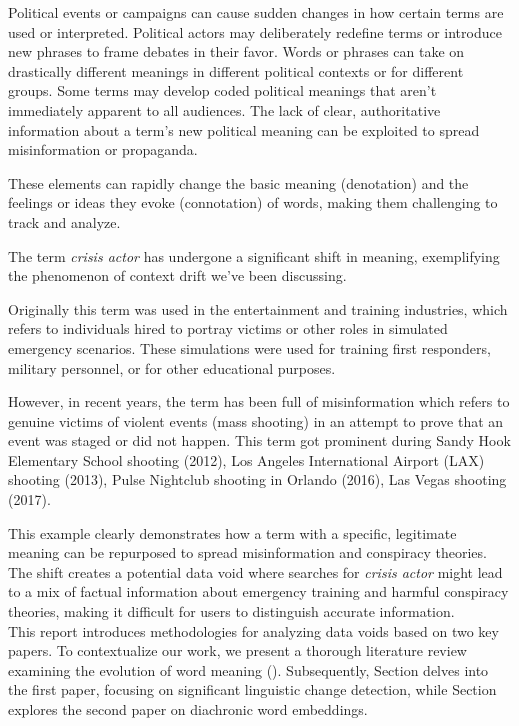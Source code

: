 Political events or campaigns can cause sudden changes in how certain terms are used or interpreted.
Political actors may deliberately redefine terms or introduce new phrases to frame debates in their favor.
Words or phrases can take on drastically different meanings in different political contexts or for different groups.
Some terms may develop coded political meanings that aren't immediately apparent to all audiences.
The lack of clear, authoritative information about a term's new political meaning can be exploited to spread misinformation or propaganda.

These elements can rapidly change the basic meaning (denotation) and the feelings or ideas they evoke (connotation) of words, making them challenging to track and analyze.

The term \emph{crisis actor} has undergone a significant shift in meaning,
exemplifying the phenomenon of context drift we've been discussing.

Originally this term was used in the entertainment and training industries,
which refers to individuals hired to portray victims or other roles in simulated emergency scenarios.
These simulations were used for training first responders, military personnel, or for other educational purposes.

However, in recent years, the term has been full of misinformation which refers to genuine victims of violent events (mass shooting) in an attempt to prove that an event was staged or did not happen.
This term got prominent during Sandy Hook Elementary School shooting (2012), Los Angeles International Airport (LAX) shooting (2013), Pulse Nightclub shooting in Orlando (2016), Las Vegas shooting (2017).

This example clearly demonstrates how a term with a specific, legitimate meaning can be repurposed to spread misinformation and conspiracy theories.
The shift creates a potential data void where searches for \emph{crisis actor} might lead to a mix of factual information about emergency training and harmful conspiracy theories,
making it difficult for users to distinguish accurate information.\\

This report introduces methodologies for analyzing data voids based on two key papers.
To contextualize our work, we present a thorough literature review examining the evolution of word meaning ().
Subsequently, Section  delves into the first paper, focusing on significant linguistic change detection,
while Section  explores the second paper on diachronic word embeddings.















